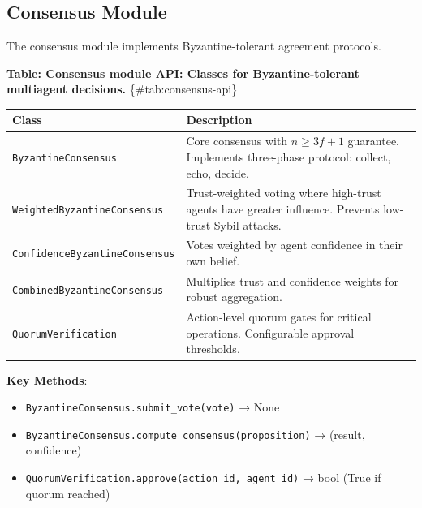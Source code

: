 \documentclass[
]{article}
\newcounter{none} %
\providecommand{\tightlist}{%
  \setlength{\itemsep}{0pt}\setlength{\parskip}{0pt}}
\begin{document}
\subsection{Consensus Module}\label{sec:consensus-api}

The consensus module implements Byzantine-tolerant agreement protocols.

\textbf{Table: Consensus module API: Classes for Byzantine-tolerant
multiagent decisions.} \{\#tab:consensus-api\}

{\def\LTcaptype{none} %
\begin{longtable}[]{@{}
  >{\raggedright\arraybackslash}p{}
  >{\raggedright\arraybackslash}p{}@{}}
\toprule\noalign{}
\begin{minipage}[b]{\linewidth}\raggedright
Class
\end{minipage} & \begin{minipage}[b]{\linewidth}\raggedright
Description
\end{minipage} \\
\midrule\noalign{}
\endhead
\bottomrule\noalign{}
\endlastfoot
\texttt{ByzantineConsensus} & Core consensus with \(n \geq 3f + 1\)
guarantee. Implements three-phase protocol: collect, echo, decide. \\
\texttt{WeightedByzantineConsensus} & Trust-weighted voting where
high-trust agents have greater influence. Prevents low-trust Sybil
attacks. \\
\texttt{ConfidenceByzantineConsensus} & Votes weighted by agent
confidence in their own belief. \\
\texttt{CombinedByzantineConsensus} & Multiplies trust and confidence
weights for robust aggregation. \\
\texttt{QuorumVerification} & Action-level quorum gates for critical
operations. Configurable approval thresholds. \\
\end{longtable}
}

\textbf{Key Methods}:

\begin{itemize}
\tightlist
\item
  \texttt{ByzantineConsensus.submit\_vote(vote)} → None
\item
  \texttt{ByzantineConsensus.compute\_consensus(proposition)} → (result,
  confidence)
\item
  \texttt{QuorumVerification.approve(action\_id,\ agent\_id)} → bool
  (True if quorum reached)
\end{itemize}
\end{document}

